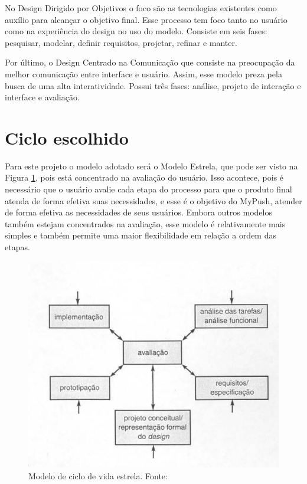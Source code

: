 No Design Dirigido por Objetivos o foco são as tecnologias existentes como auxílio para alcançar o objetivo final. Esse processo tem foco tanto no usuário como na
experiência do design no uso do modelo. Consiste em seis fases: pesquisar, modelar, definir requisitos, projetar, refinar e manter. \cite{BARBOSA}

Por último, o Design Centrado na Comunicação que consiste na preocupação da melhor comunicação entre interface e usuário. Assim, esse modelo preza pela busca de uma
alta interatividade. Possui três fases: análise, projeto de interação e interface e avaliação. \cite{BARBOSA}

\section{Ciclo escolhido}
Para este projeto o modelo adotado será o Modelo Estrela, que pode ser visto na Figura \ref{ciclo}, pois está concentrado na avaliação do usuário. Isso acontece, pois é necessário que o usuário avalie cada 
etapa do processo para que o produto final atenda de forma efetiva suas necessidades, e esse é o objetivo do MyPush, atender de forma efetiva as necessidades de seus
usuários. Embora outros modelos também estejam concentrados na avaliação, esse modelo é relativamente mais simples e também permite uma maior flexibilidade em relação a
ordem das etapas. 

\begin{figure}[!h]
 \centering
 \includegraphics[scale=0.5]{figuras/modelo_estrela.png}
 \caption{Modelo de ciclo de vida estrela. Fonte: \cite{preece}}
 \label{ciclo}
\end{figure}